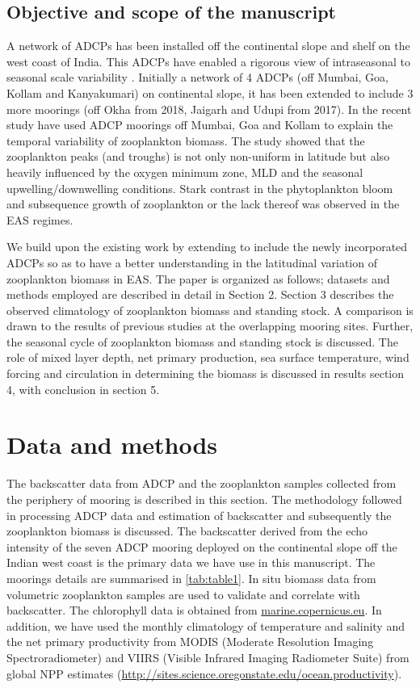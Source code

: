 \documentclass{article}
\begin{document}
	\subsection{Objective and scope of the manuscript}
	
	A network of ADCPs has been installed off the continental slope and shelf on the west coast of India. This ADCPs have enabled a rigorous view of intraseasonal to seasonal scale variability \citep{amol2014observed, chaudhuri2020observed}. Initially a network of 4 ADCPs (off Mumbai, Goa, Kollam and Kanyakumari) on continental slope, it has been extended to include 3 more moorings (off Okha from 2018, Jaigarh and Udupi from 2017). In the recent study \citep{aparna2022seasonal} have used ADCP moorings off  Mumbai, Goa and Kollam to explain the temporal variability of zooplankton biomass. The study showed that the zooplankton peaks (and troughs) is not only non-uniform in latitude but also heavily influenced by the oxygen minimum zone, MLD and the seasonal upwelling/downwelling conditions. Stark contrast in the phytoplankton bloom and subsequence  growth of zooplankton or the lack thereof was observed in the EAS regimes.


	We build upon the existing work by extending to include the newly incorporated ADCPs so as to have a better understanding in the latitudinal variation of zooplankton biomass in EAS. The paper is organized as follows; datasets and methods employed are described in detail in Section 2. Section 3 describes the observed climatology of zooplankton biomass and standing stock. A comparison is drawn to the results of previous studies at the overlapping mooring sites. Further, the seasonal cycle of zooplankton biomass and standing stock is discussed. The role of mixed layer depth, net primary production, sea surface temperature, wind forcing and circulation in determining the biomass is discussed in results section 4, with conclusion in section 5.
	
	\section{Data and methods}
	The  backscatter data from ADCP and the zooplankton samples collected from the periphery of mooring is described in this section. The methodology followed in processing ADCP data and estimation of backscatter and subsequently the zooplankton biomass is discussed. The backscatter derived from the echo intensity of the seven ADCP mooring deployed on the continental slope off the Indian west coast is the primary data we have use in this manuscript. The moorings details are summarised in \autoref{tab:table1}. In situ biomass data from volumetric zooplankton samples are used to validate and correlate with backscatter. The chlorophyll data is obtained from \href{https://data.marine.copernicus.eu/products}{marine.copernicus.eu}. In addition, we have used the monthly climatology of temperature and salinity \citep{chatterjee2012new} and the net primary productivity from MODIS (Moderate Resolution Imaging Spectroradiometer) and VIIRS (Visible Infrared Imaging Radiometer Suite) from global NPP estimates (\href{http://sites.science.oregonstate.edu/ocean.productivity}{http://sites.science.oregonstate.edu/ocean.productivity}). 
	
\end{document}
